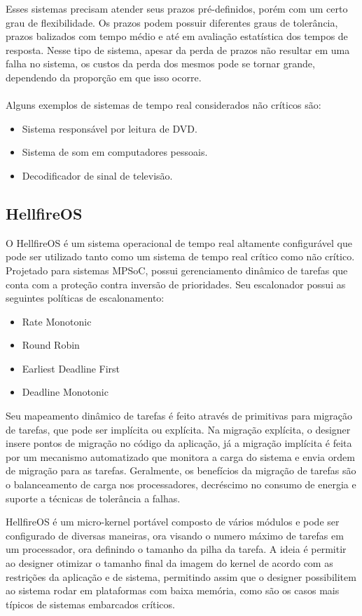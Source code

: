Esses sistemas precisam atender seus prazos pré-definidos, porém com um certo grau de flexibilidade.
Os prazos podem possuir diferentes graus de tolerância, prazos balizados com tempo médio e até em avaliação
estatística dos tempos de resposta. Nesse tipo de sistema, apesar da perda de prazos não resultar em uma
falha no sistema, os custos da perda dos mesmos pode se tornar grande, dependendo da proporção em que isso
ocorre.~\cite{Li:2003:RCE:829584} \\\\
Alguns exemplos de sistemas de tempo real considerados não críticos são:
\begin{itemize}
\item Sistema responsável por leitura de DVD.
\item Sistema de som em computadores pessoais.
\item Decodificador de sinal de televisão.
\end{itemize}

\subsection{HellfireOS}
\label{sec:HellfireOS}
O HellfireOS é um sistema operacional de tempo real altamente configurável que pode ser
utilizado tanto como um sistema de tempo real crítico como não crítico.
Projetado para sistemas MPSoC, possui gerenciamento dinâmico de tarefas que conta com a
proteção contra inversão de prioridades. Seu escalonador possui as seguintes políticas de escalonamento:

\begin{itemize}
\item Rate Monotonic
\item Round Robin
\item Earliest Deadline First
\item Deadline Monotonic
\end{itemize}

Seu mapeamento dinâmico de tarefas é feito através de primitivas para migração de tarefas, que pode
ser implícita ou explícita. Na migração explícita, o designer insere pontos de migração no código
da aplicação, já a migração implícita é feita por um mecanismo automatizado que monitora a carga do
sistema e envia ordem de migração para as tarefas. Geralmente, os benefícios da migração de tarefas são
o balanceamento de carga nos processadores, decréscimo no consumo de energia e suporte a técnicas de
tolerância a falhas.

HellfireOS é um micro-kernel portável composto de vários módulos e pode ser configurado de diversas maneiras,
ora visando o numero máximo de tarefas em um processador, ora definindo o tamanho da pilha da tarefa.
A ideia é permitir ao designer otimizar o tamanho final da imagem do kernel de acordo com as restrições
da aplicação e de sistema, permitindo assim que o designer possibilitem ao sistema rodar em plataformas com
baixa memória, como são os casos mais típicos de sistemas embarcados críticos.

